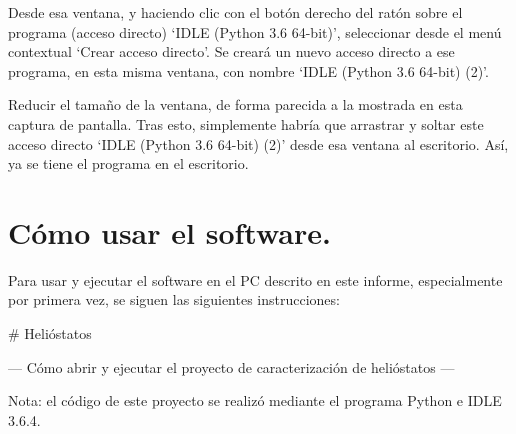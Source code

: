 \documentclass[12pt]{article}
\begin{document}
Desde esa ventana, y haciendo clic con el botón derecho del ratón sobre el programa (acceso directo) ‘IDLE (Python 3.6 64-bit)’, seleccionar desde el menú contextual ‘Crear acceso directo’. Se creará un nuevo acceso directo a ese programa, en esta misma ventana, con nombre ‘IDLE (Python 3.6 64-bit) (2)’.



Reducir el tamaño de la ventana, de forma parecida a la mostrada en esta captura de pantalla. Tras esto, simplemente habría que arrastrar y soltar este acceso directo ‘IDLE (Python 3.6 64-bit) (2)’ desde esa ventana al escritorio. Así, ya se tiene el programa en el escritorio.

\section{Cómo usar el software.}

Para usar y ejecutar el software en el PC descrito en este informe, especialmente por primera vez, se siguen las siguientes instrucciones:

\# Helióstatos

--- Cómo abrir y ejecutar el proyecto de caracterización de helióstatos ---

Nota: el código de este proyecto se realizó mediante el programa Python e IDLE 3.6.4.
\end{document}
